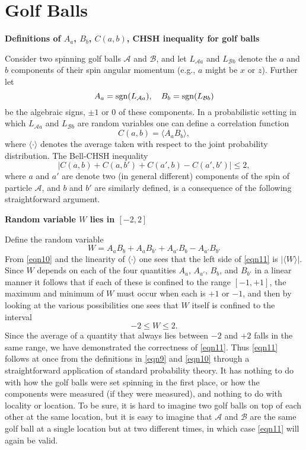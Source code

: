 \documentclass[10pt]{article} %
\def\outl#1{\par{\medskip\noindent\hspace*{.5cm}\bf
      \mathversion{bold}#1\mathversion{normal}\smallskip} }
\def\np{} \def\xa{} \def\xb{} \def\xn{} \def\xp{}
\def\outl#1{} \def\np{} \def\xa{} \def\xb{} \def\xn{} \def\xp{}
\def\outl#1{\par{\medskip\noindent\hspace*{.5cm}\bf
      \mathversion{bold}#1\mathversion{normal}\smallskip} }
\def\np{\newpage }\def\xn{\nopagebreak }\def\xp{\pagebreak }
\newcommand{\avg}[1]{\langle #1\rangle }
\newcommand{\sgn}{\mathop{\rm sgn}}
\newcommand{\AM}{{\mathcal A}}
\newcommand{\BM}{{\mathcal B}}
\begin{document}
\xb
\section{Golf Balls}
\label{sct4}
\xa

\xb
\outl{Definitions of $A_a$, $B_b$, $C(a,b)$, CHSH inequality for golf balls}
\xa



Consider two spinning golf balls $\AM$ and $\BM$, and let $L_{\AM a}$ and
$L_{\BM b}$
denote the $a$ and $b$ components of their spin angular momentum (e.g., 
$a$ might be $x$ or $z$). Further let
\begin{equation}
  A_a = \sgn(L_{\AM a}),\quad  B_b = \sgn(L_{\BM b})
\label{eqn9}
\end{equation}
be the algebraic signs, $\pm1$ or $0$ of these components.  In a probabilistic
setting in which $L_{\AM a}$ and $L_{\BM b}$ are random variables one can
define a correlation function
\begin{equation}
  C(a,b) = \avg{A_a B_b},
\label{eqn10}
\end{equation}
where $\avg{\cdot}$ denotes the average taken with respect to the joint
probability distribution.  The Bell-CHSH inequality \cite{CHSH69,Bll81,Bll90b}
\begin{equation}
  |C(a,b) + C(a,b') + C(a',b) - C(a',b')| \leq 2,
\label{eqn11}
\end{equation}
where $a$ and $a'$ are denote two (in general different) components of the
spin of particle $\AM$, and $b$ and $b'$ are similarly defined,
is a consequence of the following straightforward argument.

\xb
\outl{Random variable $W$ lies in $[-2,2]$}
\xa


Define the random variable
\begin{equation}
  W = A_a B_b +A_a B_{b'} +A_{a'} B_b -A_{a'} B_{b'}
\label{eqn12}
\end{equation}
From \eqref{eqn10} and the linearity of $\avg{\cdot}$ one sees that the left
side of \eqref{eqn11} is $|\avg{W}|$.  Since $W$ depends on each of the four
quantities $A_a$, $A_{a'}$, $B_b$, and $B_{b'}$ in a linear manner it follows
that if each of these is confined to the range $[-1,+1]$, the maximum and
minimum of $W$ must occur when each is $+1$ or $-1$, and then by looking at
the various possibilities one sees that $W$ itself is confined to the interval
\begin{equation}
  -2\leq W\leq 2.
\label{eqn13}
\end{equation}
Since the
average of a quantity that always lies between $-2$ and $+2$
falls in the same range, we have demonstrated the correctness of \eqref{eqn11}.
%
Thus \eqref{eqn11} follows at once from the definitions in
\eqref{eqn9} and \eqref{eqn10} through a straightforward application of
standard probability theory.  It has nothing to do with how the golf balls
were set spinning in the first place, or how the components were measured (if
they were measured), and nothing to do with locality or location.  To be sure,
it is hard to imagine two golf balls on top of each other at the same
location, but it is easy to imagine that $\AM$ and $\BM$ are the same golf
ball at a single location but at two different times, in which case
\eqref{eqn11} will again be valid.
\end{document}
